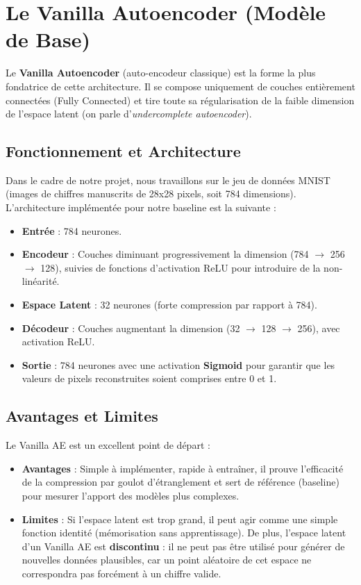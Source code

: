 \documentclass[11pt,a4paper]{report}
\begin{document}
\section{Le Vanilla Autoencoder (Modèle de Base)}

Le \textbf{Vanilla Autoencoder} (auto-encodeur classique) est la forme la plus fondatrice de cette architecture. Il se compose uniquement de couches entièrement connectées (Fully Connected) et tire toute sa régularisation de la faible dimension de l'espace latent (on parle d'\textit{undercomplete autoencoder}).

\subsection{Fonctionnement et Architecture}
Dans le cadre de notre projet, nous travaillons sur le jeu de données MNIST (images de chiffres manuscrits de 28x28 pixels, soit 784 dimensions). L'architecture implémentée pour notre baseline est la suivante :
\begin{itemize}
    \item \textbf{Entrée} : 784 neurones.
    \item \textbf{Encodeur} : Couches diminuant progressivement la dimension (784 $\rightarrow$ 256 $\rightarrow$ 128), suivies de fonctions d'activation ReLU pour introduire de la non-linéarité.
    \item \textbf{Espace Latent} : 32 neurones (forte compression par rapport à 784).
    \item \textbf{Décodeur} : Couches augmentant la dimension (32 $\rightarrow$ 128 $\rightarrow$ 256), avec activation ReLU.
    \item \textbf{Sortie} : 784 neurones avec une activation \textbf{Sigmoid} pour garantir que les valeurs de pixels reconstruites soient comprises entre 0 et 1.
\end{itemize}

\subsection{Avantages et Limites}
Le Vanilla AE est un excellent point de départ :
\begin{itemize}
    \item \textbf{Avantages} : Simple à implémenter, rapide à entraîner, il prouve l'efficacité de la compression par goulot d'étranglement et sert de référence (baseline) pour mesurer l'apport des modèles plus complexes.
    \item \textbf{Limites} : Si l'espace latent est trop grand, il peut agir comme une simple fonction identité (mémorisation sans apprentissage). De plus, l'espace latent d'un Vanilla AE est \textbf{discontinu} : il ne peut pas être utilisé pour générer de nouvelles données plausibles, car un point aléatoire de cet espace ne correspondra pas forcément à un chiffre valide.
\end{itemize}
\end{document}
